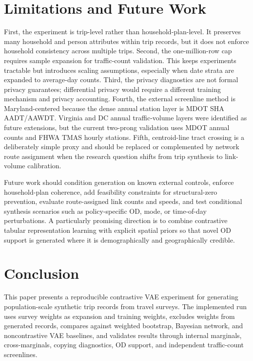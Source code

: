 \documentclass[3p,times,procedia]{elsarticle}
\begin{document}
\section{Limitations and Future Work}\label{sec:limitations}
First, the experiment is trip-level rather than household-plan-level. It preserves many household and person attributes within trip records, but it does not enforce household consistency across multiple trips. Second, the one-million-row cap requires sample expansion for traffic-count validation. This keeps experiments tractable but introduces scaling assumptions, especially when date strata are expanded to average-day counts. Third, the privacy diagnostics are not formal privacy guarantees; differential privacy would require a different training mechanism and privacy accounting. Fourth, the external screenline method is Maryland-centered because the dense annual station layer is MDOT SHA AADT/AAWDT. Virginia and DC annual traffic-volume layers were identified as future extensions, but the current two-prong validation uses MDOT annual counts and FHWA TMAS hourly stations. Fifth, centroid-line tract crossing is a deliberately simple proxy and should be replaced or complemented by network route assignment when the research question shifts from trip synthesis to link-volume calibration.

Future work should condition generation on known external controls, enforce household-plan coherence, add feasibility constraints for structural-zero prevention, evaluate route-assigned link counts and speeds, and test conditional synthesis scenarios such as policy-specific OD, mode, or time-of-day perturbations. A particularly promising direction is to combine contrastive tabular representation learning with explicit spatial priors so that novel OD support is generated where it is demographically and geographically credible.

\section{Conclusion}\label{sec:conclusion}
This paper presents a reproducible contrastive VAE experiment for generating population-scale synthetic trip records from travel surveys. The implemented run uses survey weights as expansion and training weights, excludes weights from generated records, compares against weighted bootstrap, Bayesian network, and noncontrastive VAE baselines, and validates results through internal marginals, cross-marginals, copying diagnostics, OD support, and independent traffic-count screenlines.
\end{document}
